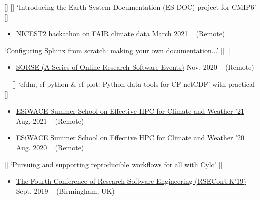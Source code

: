 \begin{talks}
    \talk
	{\faCommentingO \hspace{1mm} [\faUserPlus] [\faEnvelopeO] \hspace{1mm} `Introducing the Earth System Documentation (ES-DOC) project for CMIP6' [\href{https://github.com/sadielbartholomew/sadielbartholomew/blob/master/talks-and-workshops/es-doc-for-cmip6-intro.pdf}{\small{\linkSymbol}}]}
	{
	\begin{itemize}[leftmargin=.4in]
	    \item \href{https://nordicesmhub.github.io/nicest2-fair-hackathon/}{NICEST2 hackathon on FAIR climate data}
	    \hfill March 2021 ~ (Remote)
	\end{itemize}
	}

    \talk
	{\faWrench \hspace{1mm} `Configuring Sphinx from scratch: making your own documentation...' [\href{https://zenodo.org/records/3977886#.X6BP7nX7TeQ}{\small{\linkSymbol}}] [\href{https://www.youtube.com/watch?v=Xjei353h-f0}{\small{\videoSymbol}}]}
	{
	\begin{itemize}[leftmargin=.4in]
	    \item \href{https://sorse.github.io/}{SORSE (A Series of Online Research Software Events)}
	    \hfill Nov. 2020 ~ (Remote)
	\end{itemize}
	}

    \talk
	{\faCommentingO \hspace{1mm} {\Large{+}}\hspace{1mm} \faWrench \hspace{1mm} [\faEnvelopeO] \hspace{1mm} `cfdm, cf-python \& cf-plot: Python data tools for CF-netCDF' with practical [\href{https://hps.vi4io.org/_media/events/2021/ss2021-ncas_data_tools_for_cfnetcdf.pdf}{\small{\linkSymbol}}]}
	{
	\begin{itemize}[leftmargin=.4in]
	    \item \href{https://hps.vi4io.org/events/2021/esiwace-school}{ESiWACE Summer School on Effective HPC for Climate and Weather '21}
	    \hfill Aug. 2021 ~ (Remote)
	    \item \href{https://hps.vi4io.org/events/2020/esiwace-school}{ESiWACE Summer School on Effective HPC for Climate and Weather '20}
	    \hfill Aug. 2020 ~ (Remote)
	\end{itemize}
	}

    \talk
	{\faCommentingO \hspace{1mm} [\faUserPlus] \hspace{1mm} `Pursuing and supporting reproducible workflows for all with Cylc' [\href{https://metomi.github.io/presentations/RSEConUK2019-Cylc-Talk/#/title-slide}{\small{\linkSymbol}}]}
	{
	\begin{itemize}[leftmargin=.4in]
	    \item \href{https://rseconuk2019.sched.com/}{The Fourth Conference of Research Software Engineering (RSEConUK'19)}
	    \hfill Sept. 2019 ~ (Birmingham, UK)
	\end{itemize}
	}


\end{talks}
